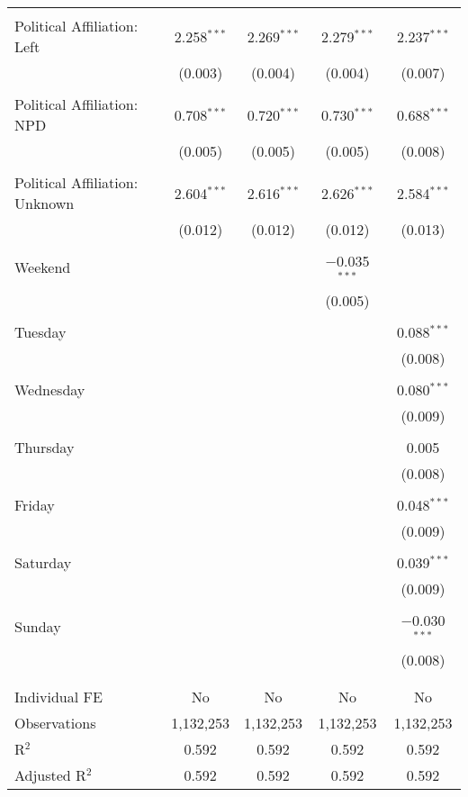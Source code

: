 \documentclass[
]{article}
\begin{document}
\begin{table}[!htbp]
{\begin{tabular}{@{\extracolsep{5pt}}lcccc}
  & & & & \\ 
 Political Affiliation: Left & 2.258$^{***}$ & 2.269$^{***}$ & 2.279$^{***}$ & 2.237$^{***}$ \\ 
  & (0.003) & (0.004) & (0.004) & (0.007) \\ 
  & & & & \\ 
 Political Affiliation: NPD & 0.708$^{***}$ & 0.720$^{***}$ & 0.730$^{***}$ & 0.688$^{***}$ \\ 
  & (0.005) & (0.005) & (0.005) & (0.008) \\ 
  & & & & \\ 
 Political Affiliation: Unknown & 2.604$^{***}$ & 2.616$^{***}$ & 2.626$^{***}$ & 2.584$^{***}$ \\ 
  & (0.012) & (0.012) & (0.012) & (0.013) \\ 
  & & & & \\ 
 Weekend &  &  & $-$0.035$^{***}$ &  \\ 
  &  &  & (0.005) &  \\ 
  & & & & \\ 
 Tuesday &  &  &  & 0.088$^{***}$ \\ 
  &  &  &  & (0.008) \\ 
  & & & & \\ 
 Wednesday &  &  &  & 0.080$^{***}$ \\ 
  &  &  &  & (0.009) \\ 
  & & & & \\ 
 Thursday &  &  &  & 0.005 \\ 
  &  &  &  & (0.008) \\ 
  & & & & \\ 
 Friday &  &  &  & 0.048$^{***}$ \\ 
  &  &  &  & (0.009) \\ 
  & & & & \\ 
 Saturday &  &  &  & 0.039$^{***}$ \\ 
  &  &  &  & (0.009) \\ 
  & & & & \\ 
 Sunday &  &  &  & $-$0.030$^{***}$ \\ 
  &  &  &  & (0.008) \\ 
  & & & & \\ 
\hline \\[-1.8ex] 
Individual FE & No & No & No & No \\ 
Observations & 1,132,253 & 1,132,253 & 1,132,253 & 1,132,253 \\ 
R$^{2}$ & 0.592 & 0.592 & 0.592 & 0.592 \\ 
Adjusted R$^{2}$ & 0.592 & 0.592 & 0.592 & 0.592 \\ 

\end{tabular}}
\end{table}
\end{document}
